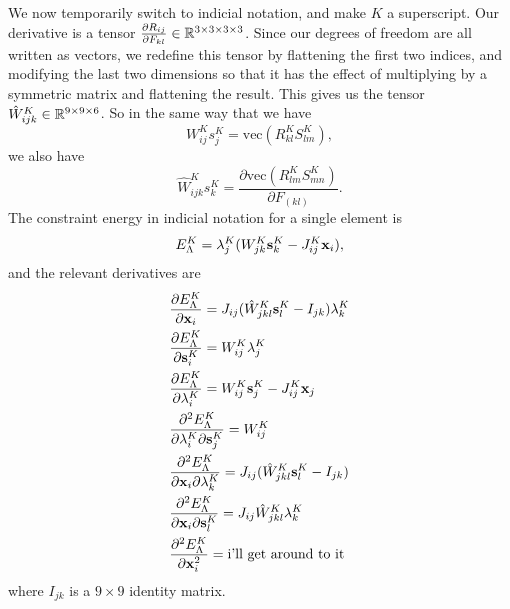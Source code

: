 We now temporarily switch to indicial notation, and make $K$ a superscript. Our derivative is a tensor $\frac{\partial R_{ij}}{\partial F_{kl}} \in \mathbb{R}^{3 \times 3 \times 3 \times 3}$. Since our degrees of freedom are all written as vectors, we redefine this tensor by flattening the first two indices, and modifying the last two dimensions so that it has the effect of multiplying by a symmetric matrix and flattening the result. This gives us the tensor $\hat{W}^K_{ijk} \in \mathbb{R}^{9 \times 9 \times 6}$. So in the same way that we have
\begin{equation}
W^K_{ij}s^K_j = \text{vec}(R^K_{kl} S^K_{lm}),
\end{equation}
we also have
\begin{equation}
\hat{W}^K_{ijk}s^K_{k} = \frac{\partial \text{vec}(R^K_{lm}S^K_{mn})}{\partial F_{(kl)}}.
\end{equation}
The constraint energy in indicial notation for a single element is 
\begin{equation}
E_\Lambda^K = \mathbf{\lambda}_j^K(W^K_{jk}\mathbf{s}^K_k - J^K_{ij}\mathbf{x}_i),
\end{equation}
and the relevant derivatives are
\begin{align}
&\frac{\partial E_\Lambda^K}{\partial \mathbf{x}_i} = 
J_{ij}(\hat{W}^K_{jkl}\mathbf{s}^K_l - I_{jk})\mathbf{\lambda}^K_k \\
&\frac{\partial E_\Lambda^K}{\partial \mathbf{s}^K_i}  = 
W_{ij}^K \mathbf{\lambda}^K_{j} \\
&\frac{\partial E_\Lambda^K}{\partial \mathbf{\lambda}^K_i} = 
W_{ij}^K \mathbf{s}^{K}_j - J_{ij}^K \mathbf{x}_j \\
&\frac{\partial^2 E_\Lambda^K}{\partial \mathbf{\lambda}^K_i \partial \mathbf{s}^K_j} =
W^K_{ij} \\
&\frac{\partial^2 E_\Lambda^K}{\partial \mathbf{x}_i \partial \mathbf{\lambda}^K_k} =
J_{ij}(\hat{W}^K_{jkl}\mathbf{s}^K_l - I_{jk}) \\
&\frac{\partial^2 E_\Lambda^K}{\partial \mathbf{x}_i \partial \mathbf{s}_l^K} =
J_{ij}\hat{W}^K_{jkl}\mathbf{\lambda}^K_k \\
&\frac{\partial^2 E_\Lambda^K}{\partial \mathbf{x}_i^2} =
\text{i'll get around to it} \\
\end{align}
where $I_{jk}$ is a $9 \times 9$ identity matrix.
